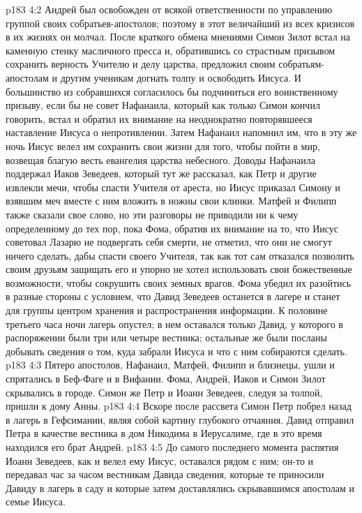 \vs p183 4:2 Андрей был освобожден от всякой ответственности по управлению группой своих собратьев\hyp{}апостолов; поэтому в этот величайший из всех кризисов в их жизнях он молчал. После краткого обмена мнениями Симон Зилот встал на каменную стенку масличного пресса и, обратившись со страстным призывом сохранить верность Учителю и делу царства, предложил своим собратьям\hyp{}апостолам и другим ученикам догнать толпу и освободить Иисуса. И большинство из собравшихся согласилось бы подчиниться его воинственному призыву, если бы не совет Нафанаила, который как только Симон кончил говорить, встал и обратил их внимание на неоднократно повторявшееся наставление Иисуса о непротивлении. Затем Нафанаил напомнил им, что в эту же ночь Иисус велел им сохранить свои жизни для того, чтобы пойти в мир, возвещая благую весть евангелия царства небесного. Доводы Нафанаила поддержал Иаков Зеведеев, который тут же рассказал, как Петр и другие извлекли мечи, чтобы спасти Учителя от ареста, но Иисус приказал Симону и взявшим меч вместе с ним вложить в ножны свои клинки. Матфей и Филипп также сказали свое слово, но эти разговоры не приводили ни к чему определенному до тех пор, пока Фома, обратив их внимание на то, что Иисус советовал Лазарю не подвергать себя смерти, не отметил, что они не смогут ничего сделать, дабы спасти своего Учителя, так как тот сам отказался позволить своим друзьям защищать его и упорно не хотел использовать свои божественные возможности, чтобы сокрушить своих земных врагов. Фома убедил их разойтись в разные стороны с условием, что Давид Зеведеев останется в лагере и станет для группы центром хранения и распространения информации. К половине третьего часа ночи лагерь опустел; в нем оставался только Давид, у которого в распоряжении были три или четыре вестника; остальные же были посланы добывать сведения о том, куда забрали Иисуса и что с ним собираются сделать.
\vs p183 4:3 Пятеро апостолов, Нафанаил, Матфей, Филипп и близнецы, ушли и спрятались в Беф\hyp{}Фаге и в Вифании. Фома, Андрей, Иаков и Симон Зилот скрывались в городе. Симон же Петр и Иоанн Зеведеев, следуя за толпой, пришли к дому Анны.
\vs p183 4:4 Вскоре после рассвета Симон Петр побрел назад в лагерь в Гефсимании, являя собой картину глубокого отчаяния. Давид отправил Петра в качестве вестника в дом Никодима в Иерусалиме, где в это время находился его брат Андрей.
\vs p183 4:5 До самого последнего момента распятия Иоанн Зеведеев, как и велел ему Иисус, оставался рядом с ним; он\hyp{}то и передавал час за часом вестникам Давида сведения, которые те приносили Давиду в лагерь в саду и которые затем доставлялись скрывавшимся апостолам и семье Иисуса.
